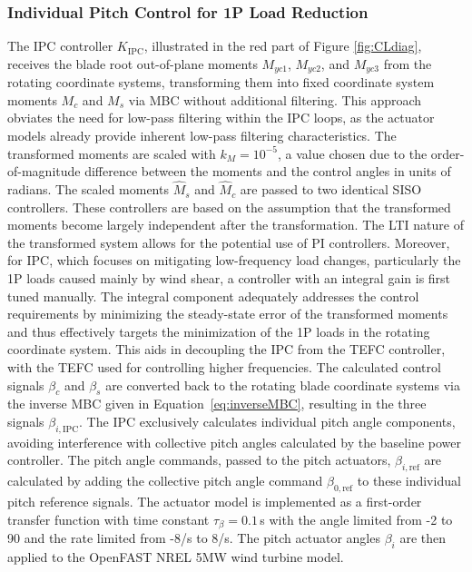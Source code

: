 \subsubsection*{Individual Pitch Control for 1P Load Reduction}
The IPC controller $K_{\text{IPC}}$, illustrated in the red part of Figure \ref{fig:CLdiag}, receives the blade root out-of-plane moments $M_{yc1}$, $M_{yc2}$, and $M_{yc3}$ from the rotating coordinate systems, transforming them into fixed coordinate system moments $M_c$ and $M_s$ via MBC without additional filtering. This approach obviates the need for low-pass filtering within the IPC loops, as the actuator models already provide inherent low-pass filtering characteristics. The transformed moments are scaled with $k_M = 10^{-5}$, a value chosen due to the order-of-magnitude difference between the moments and the control angles in units of radians. The scaled moments $\hat{M}_s$ and $\hat{M}_c$ are passed to two identical SISO controllers. These controllers are based on the assumption that the transformed moments become largely independent after the transformation. The LTI nature of the transformed system allows for the potential use of PI controllers. Moreover, for IPC, which focuses on mitigating low-frequency load changes, particularly the 1P loads caused mainly by wind shear, a controller with an integral gain is first tuned manually. The integral component adequately addresses the control requirements by minimizing the steady-state error of the transformed moments and thus effectively targets the minimization of the 1P loads in the rotating coordinate system. This aids in decoupling the IPC from the TEFC controller, with the TEFC used for controlling higher frequencies. The calculated control signals $\beta_c$ and $\beta_s$ are converted back to the rotating blade coordinate systems via the inverse MBC given in Equation~\eqref{eq:inverseMBC}, resulting in the three signals $\beta_{i,\text{IPC}}$. The IPC exclusively calculates individual pitch angle components, avoiding interference with collective pitch angles calculated by the baseline power controller. The pitch angle commands, passed to the pitch actuators, $\beta_{i,\text{ref}}$ are calculated by adding the collective pitch angle command $\beta_{0,\text{ref}}$ to these individual pitch reference signals. The actuator model is implemented as a first-order transfer function with time constant $\tau_{\beta}=0.1$\,s with the angle limited from -2\textdegree{} to 90\textdegree{} and the rate limited from -8\textdegree{}/s to 8\textdegree{}/s. The pitch actuator angles $\beta_i$ are then applied to the OpenFAST NREL 5MW wind turbine model.

